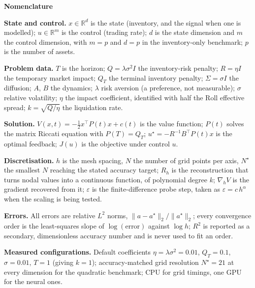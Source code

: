 \documentclass[11pt]{article}
\begin{document}
\begin{center}
{\large\bfseries Nomenclature}
\end{center}

\vspace{0.5em}
\noindent\textbf{State and control.} $x \in \mathbb{R}^d$ is the state (inventory, and the signal
when one is modelled); $u \in \mathbb{R}^m$ is the control (trading rate); $d$ is the state
dimension and $m$ the control dimension, with $m = p$ and $d = p$ in the inventory-only benchmark;
$p$ is the number of assets.

\medskip
\noindent\textbf{Problem data.} $T$ is the horizon; $Q = \lambda\sigma^2 I$ the inventory-risk
penalty; $R = \eta I$ the temporary market impact; $Q_T$ the terminal inventory penalty;
$\Sigma = \sigma I$ the diffusion; $A$, $B$ the dynamics; $\lambda$ risk aversion (a preference, not
measurable); $\sigma$ relative volatility; $\eta$ the impact coefficient, identified with half the
Roll effective spread; $k = \sqrt{Q/\eta}$ the liquidation rate.

\medskip
\noindent\textbf{Solution.} $V(x,t) = -\tfrac12 x^\top P(t)x + c(t)$ is the value function;
$P(t)$ solves the matrix Riccati equation with $P(T) = Q_T$; $u^\star = -R^{-1}B^\top P(t)x$ is the
optimal feedback; $J(u)$ is the objective under control $u$.

\medskip
\noindent\textbf{Discretisation.} $h$ is the mesh spacing, $N$ the number of grid points per axis,
$N^\star$ the smallest $N$ reaching the stated accuracy target; $R_h$ is the reconstruction that
turns nodal values into a continuous function, of polynomial degree $k$; $\nabla_h V$ is the gradient
recovered from it; $\varepsilon$ is the finite-difference probe step, taken as
$\varepsilon = c\,h^{\alpha}$ when the scaling is being tested.

\medskip
\noindent\textbf{Errors.} All errors are relative $L^2$ norms,
$\|a - a^\star\|_2 / \|a^\star\|_2$; every convergence order is the least-squares slope of
$\log(\text{error})$ against $\log h$; $R^2$ is reported as a secondary, dimensionless accuracy
number and is never used to fit an order.

\medskip
\noindent\textbf{Measured configurations.} Default coefficients $\eta = \lambda\sigma^2 = 0.01$,
$Q_T = 0.1$, $\sigma = 0.01$, $T = 1$ (giving $k = 1$); accuracy-matched grid resolution
$N^\star = 21$ at every dimension for the quadratic benchmark; CPU for grid timings, one GPU for the
neural ones.
\end{document}
